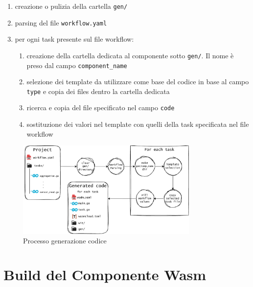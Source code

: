 \begin{enumerate}
    \item creazione o pulizia della cartella \texttt{gen/}
    \item parsing del file \texttt{workflow.yaml}
    \item per ogni task presente sul file workflow:
    \begin{enumerate}
        \item creazione della cartella dedicata al componente sotto \texttt{gen/}. Il nome è preso dal campo \texttt{component\_name}
        
        \item selezione dei template da utilizzare come base del codice in base al campo \texttt{type} e copia dei files dentro la cartella dedicata
        
        \item ricerca e copia del file specificato nel campo \texttt{code}
        
        \item sostituzione dei valori nel template con quelli della task specificata nel file workflow
    \end{enumerate}
\end{enumerate}

\FloatBarrier
\begin{figure}[h]
    \centering
    \includegraphics[width=0.8\textwidth]{img/schemi/schemi-architettura-generazione.drawio.pdf}
    \caption{Processo generazione codice}
    \label{fig:code_gen_pipeline}
\end{figure}
\FloatBarrier

\section{Build del Componente Wasm}

